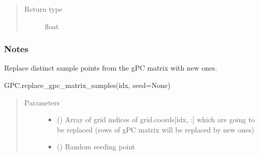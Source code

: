 \documentclass[letterpaper,10pt,english,openany,oneside]{sphinxmanual}
\begin{document}
\begin{fulllineitems}
\begin{fulllineitems}
\begin{quote}
\begin{description}
\item[{Return type}] \leavevmode
float

\end{description}\end{quote}
\subsubsection*{Notes}

\end{fulllineitems}


\begin{fulllineitems}
\label{\detokenize{pygpc:pygpc.GPC.GPC.replace_gpc_matrix_samples}}
Replace distinct sample points from the gPC matrix with new ones.

GPC.replace\_gpc\_matrix\_samples(idx, seed=None)
\begin{quote}\begin{description}
\item[{Parameters}] \leavevmode\begin{itemize}
\item {} 
 (\sphinxstyleliteralemphasis{\sphinxupquote{ {[}}}\sphinxstyleliteralemphasis{\sphinxupquote{{]}}}) \textendash{} Array of grid indices of grid.coords{[}idx, :{]} which are going to be replaced
(rows of gPC matrix will be replaced by new ones)

\item {} 
 (\sphinxstyleliteralemphasis{\sphinxupquote{, }}\sphinxstyleliteralemphasis{\sphinxupquote{, }}) \textendash{} Random seeding point

\end{itemize}

\end{description}\end{quote}

\end{fulllineitems}


\end{fulllineitems}
\end{document}
